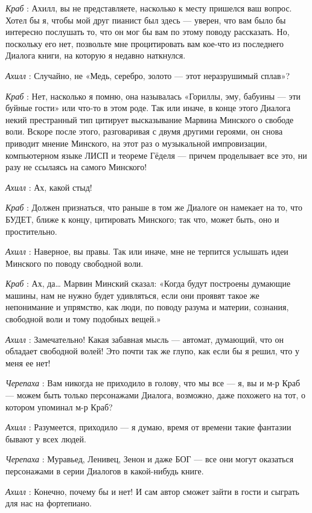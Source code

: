 \documentclass[../main.tex]{subfiles}
\begin{document}
\begin{dialogue}
\emph{Краб} : Ахилл, вы не представляете, насколько к месту пришелся ваш вопрос. Хотел бы я, чтобы мой друг пианист был здесь --- уверен, что вам было бы интересно послушать то, что он мог бы вам по этому поводу рассказать. Но, поскольку его нет, позвольте мне процитировать вам кое-что из последнего Диалога книги, на которую я недавно наткнулся.

\emph{Ахилл} : Случайно, не «Медь, серебро, золото --- этот неразрушимый сплав»?

\emph{Краб} : Нет, насколько я помню, она называлась «Гориллы, эму, бабуины --- эти буйные гости» или что-то в этом роде. Так или иначе, в конце этого Диалога некий престранный тип цитирует высказывание Марвина Минского о свободе воли. Вскоре после этого, разговаривая с двумя другими героями, он снова приводит мнение Минского, на этот раз о музыкальной импровизации, компьютерном языке ЛИСП и теореме Гёделя --- причем проделывает все это, ни разу не ссылаясь на самого Минского!

\emph{Ахилл} : Ах, какой стыд!

\emph{Краб} : Должен признаться, что раньше в том же Диалоге он намекает на то, что БУДЕТ, ближе к концу, цитировать Минского; так что, может быть, оно и простительно.

\emph{Ахилл} : Наверное, вы правы. Так или иначе, мне не терпится услышать идеи Минского по поводу свободной воли.

\emph{Краб} : Ах, да\ldots{} Марвин Минский сказал: «Когда будут построены думающие машины, нам не нужно будет удивляться, если они проявят такое же непонимание и упрямство, как люди, по поводу разума и материи, сознания, свободной воли и тому подобных вещей.»

\emph{Ахилл} : Замечательно! Какая забавная мысль --- автомат, думающий, что он обладает свободной волей! Это почти так же глупо, как если бы я решил, что у меня ее нет!

\emph{Черепаха} : Вам никогда не приходило в голову, что мы все --- я, вы и м-р Краб --- можем быть только персонажами Диалога, возможно, даже похожего на тот, о котором упоминал м-р Краб?

\emph{Ахилл} : Разумеется, приходило --- я думаю, время от времени такие фантазии бывают у всех людей.

\emph{Черепаха} : Муравьед, Ленивец, Зенон и даже БОГ --- все они могут оказаться персонажами в серии Диалогов в какой-нибудь книге.

\emph{Ахилл} : Конечно, почему бы и нет! И сам автор сможет зайти в гости и сыграть для нас на фортепиано.


\end{dialogue}
\end{document}
